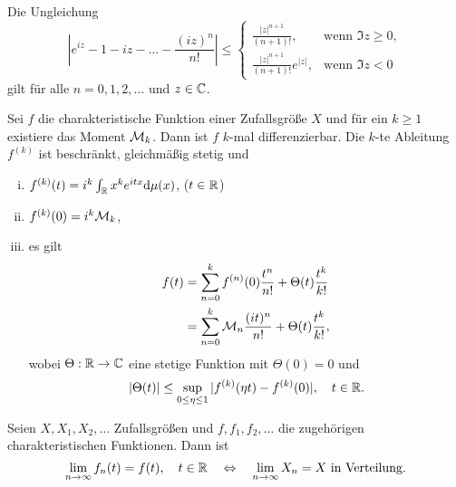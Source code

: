 \begin{lem}
  Die Ungleichung
  \[ \left| e^{iz} - 1 - iz - \ldots - \frac{(iz)^n}{n!} \right| \le
    \begin{cases}
      \frac{|z|^{n+1}}{(n+1)!}, &\text{wenn } \Im z \ge 0, \\
      \frac{|z|^{n+1}}{(n+1)!} e^{|z|}, &\text{wenn } \Im z < 0
    \end{cases} \]
  gilt für alle $n = 0, 1, 2, \ldots$ und $z \in \mathbb{C}$.
\end{lem}

\begin{thm}
  Sei $f$ die charakteristische Funktion einer Zufallsgröße $X$ und für ein $k
  \ge 1$ existiere das Moment $\mathcal{M}_k$. Dann ist $f$ $k$-mal differenzierbar. Die
  $k$-te Ableitung $f^{(k)}$ ist beschränkt, gleichmäßig stetig und
  \begin{enumerate}[i)]
  \item $f^{(k)}(t) = i^k \int_{\mathbb{R}} x^k e^{itx} \mathrm{d} \mu(x)$, \hfill ($t \in
    \mathbb{R}$)
  \item $f^{(k)}(0) = i^k \mathcal{M}_k$,
  \item es gilt
    \begin{align*}
      f(t)
      &= \sum_{n=0}^k f^{(n)}(0) \frac{t^n}{n!} + \Theta(t) \frac{t^k}{k!} \\
      &= \sum_{n=0}^k \mathcal{M}_n \frac{(it)^n}{n!} + \Theta(t) \frac{t^k}{k!},
    \end{align*}
    wobei $\Theta : \mathbb{R} \to \mathbb{C}$ eine stetige Funktion mit $\Theta(0) =
    0$ und
    \[ | \Theta(t) | \le \sup_{0 \le \eta \le 1} | f^{(k)} (\eta t) - f^{(k)}(0)
      |, \quad t \in \mathbb{R}. \]
  \end{enumerate}
\end{thm}

\begin{thm}
  Seien $X, X_1, X_2, \ldots$ Zufallsgrößen und $f, f_1, f_2, \ldots$ die
  zugehörigen charakteristischen Funktionen. Dann ist
  \[ \lim_{ n \to \infty} f_n(t) = f(t), \quad t \in \mathbb{R}
    \quad \Leftrightarrow \quad
    \lim_{n \to \infty} X_n = X \text{ in Verteilung.} \]
\end{thm}


